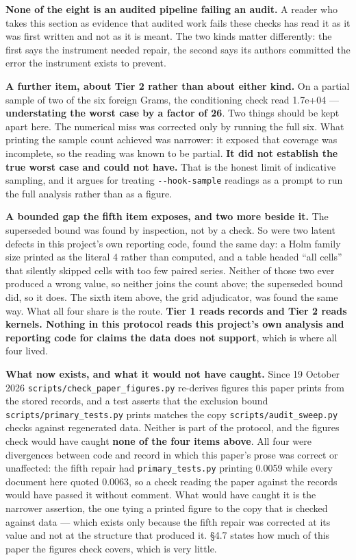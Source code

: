 \documentclass[
  10pt,
]{article}
\newcounter{none} %
\begin{document}
\textbf{None of the eight is an audited pipeline failing an audit.} A
reader who takes this section as evidence that audited work fails these
checks has read it as it was first written and not as it is meant. The
two kinds matter differently: the first says the instrument needed
repair, the second says its authors committed the error the instrument
exists to prevent.

\textbf{A further item, about Tier 2 rather than about either kind.} On
a partial sample of two of the six foreign Grams, the conditioning check
read 1.7e+04 --- \textbf{understating the worst case by a factor of 26}.
Two things should be kept apart here. The numerical miss was corrected
only by running the full six. What printing the sample count achieved
was narrower: it exposed that coverage was incomplete, so the reading
was known to be partial. \textbf{It did not establish the true worst
case and could not have.} That is the honest limit of indicative
sampling, and it argues for treating \texttt{-\/-hook-sample} readings
as a prompt to run the full analysis rather than as a figure.

\textbf{A bounded gap the fifth item exposes, and two more beside it.}
The superseded bound was found by inspection, not by a check. So were
two latent defects in this project's own reporting code, found the same
day: a Holm family size printed as the literal 4 rather than computed,
and a table headed ``all cells'' that silently skipped cells with too
few paired series. Neither of those two ever produced a wrong value, so
neither joins the count above; the superseded bound did, so it does. The
sixth item above, the grid adjudicator, was found the same way. What all
four share is the route. \textbf{Tier 1 reads records and Tier 2 reads
kernels. Nothing in this protocol reads this project's own analysis and
reporting code for claims the data does not support}, which is where all
four lived.

\textbf{What now exists, and what it would not have caught.} Since 19
October 2026 \texttt{scripts/\allowbreak{}check\_\allowbreak{}paper\_\allowbreak{}figures.py} re-derives
figures this paper prints from the stored records, and a test asserts
that the exclusion bound \texttt{scripts/\allowbreak{}primary\_\allowbreak{}tests.py} prints
matches the copy \texttt{scripts/\allowbreak{}audit\_\allowbreak{}sweep.py} checks against
regenerated data. Neither is part of the protocol, and the figures check
would have caught \textbf{none of the four items above}. All four were
divergences between code and record in which this paper's prose was
correct or unaffected: the fifth repair had \texttt{primary\_\allowbreak{}tests.py}
printing 0.0059 while every document here quoted 0.0063, so a check
reading the paper against the records would have passed it without
comment. What would have caught it is the narrower assertion, the one
tying a printed figure to the copy that is checked against data ---
which exists only because the fifth repair was corrected at its value
and not at the structure that produced it. \S{}4.7 states how much of
this paper the figures check covers, which is very little.
\end{document}
